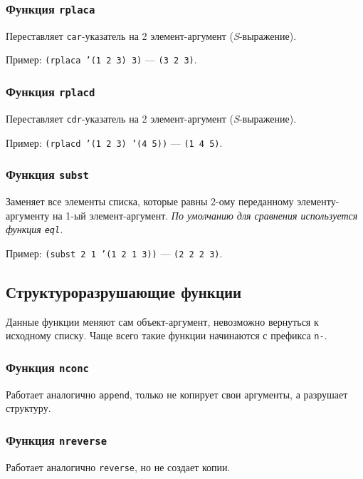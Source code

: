 \subsubsection{Функция \texttt{rplaca}}

Переставляет \texttt{car}-указатель на 2 элемент-аргумент (\textit{S}-выражение).

Пример: \texttt{(rplaca '(1 2 3) 3)} --- \texttt{(3 2 3)}.

\subsubsection{Функция \texttt{rplacd}}

Переставляет \texttt{cdr}-указатель на 2 элемент-аргумент (\textit{S}-выражение).

Пример: \texttt{(rplacd '(1 2 3) '(4 5))} --- \texttt{(1 4 5)}.

\subsubsection{Функция \texttt{subst}}

Заменяет все элементы списка, которые равны 2-ому переданному элементу-аргументу на 1-ый элемент-аргумент. \textit{По умолчанию для сравнения используется функция \texttt{eql}}.

Пример: \texttt{(subst 2 1 '(1 2 1 3))} --- \texttt{(2 2 2 3)}.

\subsection{Структуроразрушающие функции}

Данные функции меняют сам объект-аргумент, невозможно вернуться к исходному списку. Чаще всего такие функции начинаются с префикса \texttt{n-}.

\subsubsection{Функция \texttt{nconc}}

Работает аналогично \texttt{append}, только не копирует свои аргументы, а разрушает структуру.

\subsubsection{Функция \texttt{nreverse}}

Работает аналогично \texttt{reverse}, но не создает копии.

